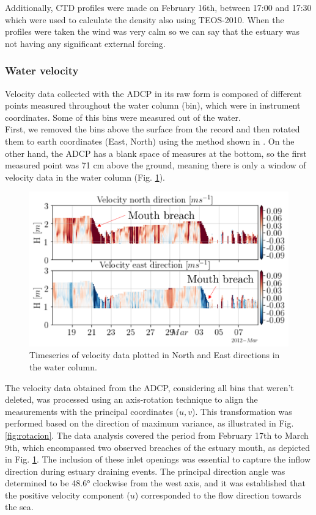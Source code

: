 \documentclass[tesis.tex]{subfiles}
\begin{document}
Additionally, CTD profiles were made on February 16th, between 17:00 and 17:30 which were used to calculate the density also using TEOS-2010. When the profiles were taken the wind was very calm so we can say that the estuary was not having any significant external forcing. \\

\subsubsection{Water velocity} \label{Estuary_currents}

Velocity data collected with the ADCP in its raw form is composed of different points measured throughout the water column (bin), which were in instrument coordinates. Some of this bins were measured out of the water.\\

First, we removed the bins above the surface from the record and then rotated them to earth coordinates (East, North) using the method shown in \cite{teledyne2008}. On the other hand, the ADCP has a blank space of measures at the bottom, so the first measured point was 71 cm above the ground, meaning there is only a window of velocity data in the water column (Fig. \ref{fig:north_east}).\\

\begin{figure}[h!]
    \centering
    \includegraphics[width=\textwidth]{Imagenes/velocity_estnorth.png}
    \caption{Timeseries of velocity data plotted in North and East directions in the water column.}
    \label{fig:north_east}
\end{figure}

The velocity data obtained from the ADCP, considering all bins that weren't deleted, was processed using an axis-rotation technique to align the measurements with the principal coordinates ($u,v$). This transformation was performed based on the direction of maximum variance, as illustrated in Fig. \ref{fig:rotacion}. The data analysis covered the period from February 17th to March 9th, which encompassed two observed breaches of the estuary mouth, as depicted in Fig. \ref{fig:north_east}. The inclusion of these inlet openings was essential to capture the inflow direction during estuary draining events. The principal direction angle was determined to be 48.6° clockwise from the west axis, and it was established that the positive velocity component ($u$) corresponded to the flow direction towards the sea.
\end{document}
